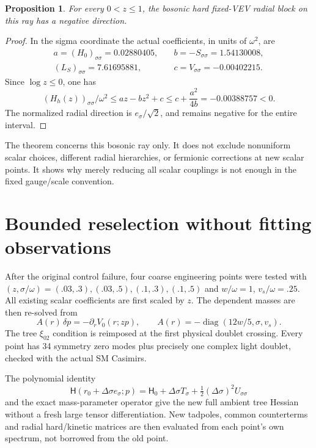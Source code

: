 \documentclass[11pt]{article}
\newcommand{\diag}{\operatorname{diag}}
\newtheorem{proposition}{Proposition}
\begin{document}
\begin{proposition}
For every $0<z\leq1$, the bosonic hard fixed-VEV radial block on this
ray has a negative direction.
\end{proposition}
\begin{proof}
In the sigma coordinate the actual coefficients, in units of
$\omega^2$, are
\begin{equation}
 \begin{aligned}
 a=(H_0)_{\sigma\sigma}=0.02880405,\quad
 &b=-S_{\sigma\sigma}=1.54130008,\\
 (L_S)_{\sigma\sigma}=7.61695881,\quad
 &c=V_{\sigma\sigma}=-0.00402215.
 \end{aligned}
\end{equation}
Since $\log z\leq0$, one has
\begin{equation}
 (H_h(z))_{\sigma\sigma}/\omega^2
 \leq az-bz^2+c\leq c+\frac{a^2}{4b}
 =-0.00388757<0.
\end{equation}
The normalized radial direction is $e_\sigma/\sqrt2$, and remains
negative for the entire interval.
\end{proof}
The theorem concerns this bosonic ray only. It does not exclude
nonuniform scalar choices, different radial hierarchies, or fermionic
corrections at new scalar points. It shows why merely reducing all
scalar couplings is not enough in the fixed gauge/scale convention.

\section{Bounded reselection without fitting observations}
After the original control failure, four coarse engineering points
were tested with $(z,\sigma/\omega)=(.03,.3),(.03,.5),(.1,.3),(.1,.5)$
and $w/\omega=1$, $v_s/\omega=.25$. All existing scalar coefficients
are first scaled by $z$. The dependent masses are then re-solved from
\begin{equation}
 A(r)\,\delta p=-\partial_r V_0(r;zp),\qquad
 A(r)=-\diag(12w/5,\sigma,v_s).
\end{equation}
The tree $\xi_{02}$ condition is reimposed at the first physical
doublet crossing. Every point has 34 symmetry zero modes plus precisely
one complex light doublet, checked with the actual SM Casimirs.

The polynomial identity
\begin{equation}
 \mathsf H(r_0+\Delta\sigma e_\sigma;p)
 =\mathsf H_0+\Delta\sigma T_\sigma
   +\tfrac12(\Delta\sigma)^2 U_{\sigma\sigma}
\end{equation}
and the exact mass-parameter operator give the new full ambient tree
Hessian without a fresh large tensor differentiation. New tadpoles,
common counterterms and radial hard/kinetic matrices are then evaluated
from each point's own spectrum, not borrowed from the old point.
\end{document}
